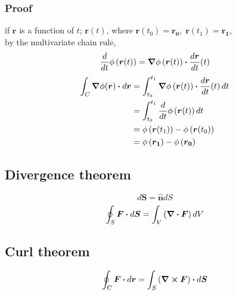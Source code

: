 \documentclass{article}
\renewcommand{\vec}[1]{\boldsymbol{#1}}
\newcommand{\vhat}[1]{\vec{\hat{#1}}}
\begin{document}
\subsubsection{Proof}
if $\vec{r}$ is a function of $t$; $\vec{r}(t)$, where $\vec{r}(t_0)=\vec{r_0}, \; \vec{r}(t_1)=\vec{r_1}$,\\
by the multivariate chain rule,
\[ \frac{d}{dt} \phi\left(\vec{r}(t)\right) = \grad{\phi \left(\vec{r}(t)\right)} \vdot \frac{d\vec{r}}{dt}(t)  \]
\begin{align*}
    \int_C \grad{\phi(\vec{r})} \vdot d\vec{r} &= \int_{t_0}^{t_1} \grad{\phi \left(\vec{r}(t)\right)} \vdot \frac{d\vec{r}}{dt}(t) \, dt \\
    &= \int_{t_0}^{t_1} \frac{d}{dt} \phi\left(\vec{r}(t)\right) dt \\
    &= \phi \left(\vec{r}(t_1)\right) - \phi \left(\vec{r}(t_0)\right) \\
    &= \phi \left(\vec{r_1}\right) - \phi \left(\vec{r_0}\right)
\end{align*}

\subsection{Divergence theorem}
\[ d\vec{S} = \vhat{n} dS \]
\[ \oint_S \vec{F} \vdot d\vec{S} = \int_V \left( \div{\vec{F}} \right) dV \]

\subsection{Curl theorem}
\[ \oint_C \vec{F} \vdot d\vec{r} = \int_S \left( \curl{\vec{F}} \right) \vdot d\vec{S} \]
\end{document}
